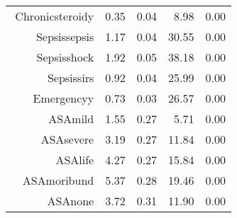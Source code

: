 \begin{tabular}{rrrrr}
$$  Chronic\-steroid\-y & 0.35 & 0.04 & 8.98 & 0.00 \\ 
  Sepsis\-sepsis & 1.17 & 0.04 & 30.55 & 0.00 \\ 
  Sepsis\-shock & 1.92 & 0.05 & 38.18 & 0.00 \\ 
  Sepsis\-sirs & 0.92 & 0.04 & 25.99 & 0.00 \\ 
  Emergency\-y & 0.73 & 0.03 & 26.57 & 0.00 \\ 
  ASA\-mild & 1.55 & 0.27 & 5.71 & 0.00 \\ 
  ASA\-severe & 3.19 & 0.27 & 11.84 & 0.00 \\ 
  ASA\-life & 4.27 & 0.27 & 15.84 & 0.00 \\ 
  ASA\-moribund & 5.37 & 0.28 & 19.46 & 0.00 \\ 
  ASA\-none & 3.72 & 0.31 & 11.90 & 0.00 \\ 
   \hline
\end{tabular}


